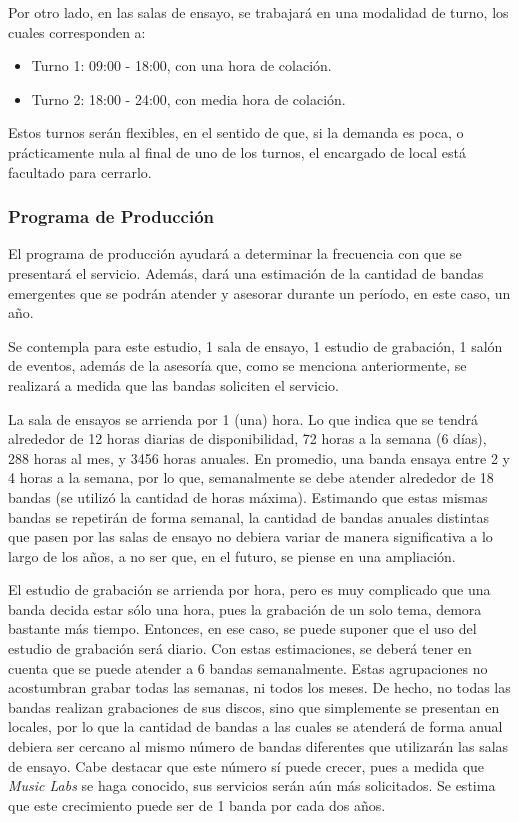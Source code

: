 Por otro lado, en las salas de ensayo, se trabajará en una modalidad de turno, los cuales
corresponden a:
\begin{itemize}
	\item Turno 1: 09:00 - 18:00, con una hora de colación.
	\item Turno 2: 18:00 - 24:00, con media hora de colación.
\end{itemize}

Estos turnos serán flexibles, en el sentido de que, si la demanda es poca, o prácticamente nula al final 
de uno de los turnos, el encargado de local está facultado para cerrarlo. 

\subsubsection{Programa de Producción}

El programa de producción ayudará a determinar la frecuencia con que se presentará 
el servicio. Además, dará una estimación de la cantidad de bandas emergentes
que se podrán atender y asesorar durante un período, en este caso, un año.

Se contempla para este estudio, 1 sala de ensayo, 1 estudio de grabación, 1 salón 
de eventos, además de la asesoría que, como se menciona anteriormente, se realizará
a medida que las bandas soliciten el servicio.

La sala de ensayos se arrienda por 1 (una) hora. Lo que indica que se tendrá alrededor
de 12 horas diarias de disponibilidad, 72 horas a la semana (6 días), 288 horas al mes, y 3456
 horas anuales. En promedio, una banda ensaya entre 2 y 4 horas a la semana, 
por lo que, semanalmente se debe atender alrededor de 18 bandas (se utilizó la cantidad
de horas máxima). Estimando que estas mismas bandas se repetirán de forma semanal, la cantidad
de bandas anuales distintas que pasen por las salas de ensayo no debiera variar de manera significativa
a lo largo de los años, a no ser que, en el futuro, se piense en una ampliación.

El estudio de grabación se arrienda por hora, pero es muy complicado que una banda 
decida estar sólo una hora, pues la grabación de un solo tema, demora bastante más tiempo. 
Entonces, en ese caso, se puede suponer que el uso del estudio de grabación será diario.
Con estas estimaciones, se deberá tener en cuenta que se puede atender a 6 bandas 
semanalmente. Estas agrupaciones no acostumbran grabar todas las semanas, ni todos los meses. 
De hecho, no todas las bandas realizan grabaciones de sus discos, sino que simplemente se 
presentan en locales, por lo que la cantidad de bandas a las cuales se atenderá de forma anual 
debiera ser cercano al mismo número de bandas diferentes que utilizarán las salas de ensayo. 
Cabe destacar que este número sí puede crecer, pues a medida que \emph{Music Labs} se haga 
conocido, sus servicios serán aún más solicitados. Se estima que este crecimiento puede ser 
de 1 banda por cada dos años.


